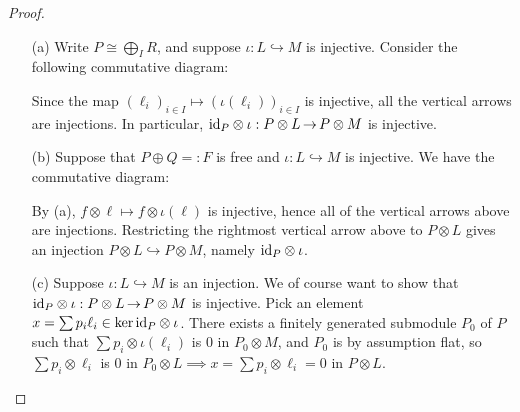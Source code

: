 \documentclass[11pt]{book}
\theoremstyle{definition}   \newtheorem{defn}[counter]{Definition} %
\DeclareMathOperator{\ra}{\rightarrow}   \DeclareMathOperator{\Poly}{\mathbf{P}}   \DeclareMathOperator{\spn}{\textnormal{span}}   \DeclareMathOperator{\aut}{\textnormal{Aut}}
\numberwithin{counter}{chapter}
\begin{document}
\begin{proof}\ 
\begin{enumerate}
\item[(a)] Write $P \cong \bigoplus_{I} R$, and suppose $\iota : L \hookrightarrow M$ is injective. Consider the following commutative diagram:


Since the map $(\ell_i)_{i \in I} \mapsto (\iota(\ell_i))_{i \in I}$ is injective, all the vertical arrows are injections. In particular, $\id_P \otimes \iota : P \otimes L \ra P \otimes M$ is injective. 

\item[(b)]Suppose that $P \oplus Q =: F$ is free and $\iota : L \hookrightarrow M$ is injective. We have the commutative diagram:


By (a), $f \otimes \ell \mapsto f \otimes \iota(\ell)$ is injective, hence all of the vertical arrows above are injections. Restricting the rightmost vertical arrow above to $P \otimes L$ gives an injection $P \otimes L \hookrightarrow P \otimes M$, namely $\textnormal{id}_P \otimes \iota$. 

\item[(c)] Suppose $\iota : L \hookrightarrow M$ is an injection. We of course want to show that $\id_P \otimes \iota : P \otimes L \ra P \otimes M$ is injective. Pick an element $x = \sum p_i \ell_i \in \ker \textnormal{id}_P \otimes \iota$. There exists a finitely generated submodule $P_0$ of $P$ such that $\sum p_i \otimes \iota(\ell_i)$ is $0$ in $P_0 \otimes M$, and $P_0$ is by assumption flat, so $\sum p_i \otimes \ell_i$ is $0$ in $P_0 \otimes L \implies x = \sum p_i \otimes \ell_i = 0$ in $P \otimes L$. 
\end{enumerate}
\end{proof}
\end{document}
